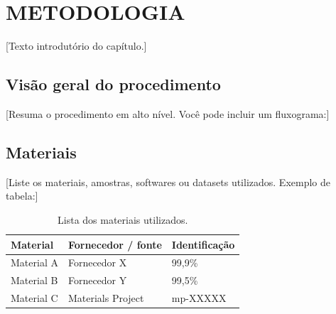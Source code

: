 
\chapter{METODOLOGIA}
\label{cap:metodologia}

[Texto introdutório do capítulo.]

\section{Visão geral do procedimento}
\label{sec:visao-geral}

[Resuma o procedimento em alto nível. Você pode incluir um fluxograma:]


\section{Materiais}
\label{sec:materiais}

[Liste os materiais, amostras, softwares ou datasets utilizados.
Exemplo de tabela:]

\begin{table}[htb]
    \centering
    \caption{Lista dos materiais utilizados.}
    \label{tab:materiais}
    \begin{tabular}{lll}
        \toprule
        \textbf{Material} & \textbf{Fornecedor / fonte} & \textbf{Identificação} \\
        \midrule
        Material A & Fornecedor X & 99{,}9\% \\
        Material B & Fornecedor Y & 99{,}5\% \\
        Material C & Materials Project & mp-XXXXX \\
        \bottomrule
    \end{tabular}
\end{table}

